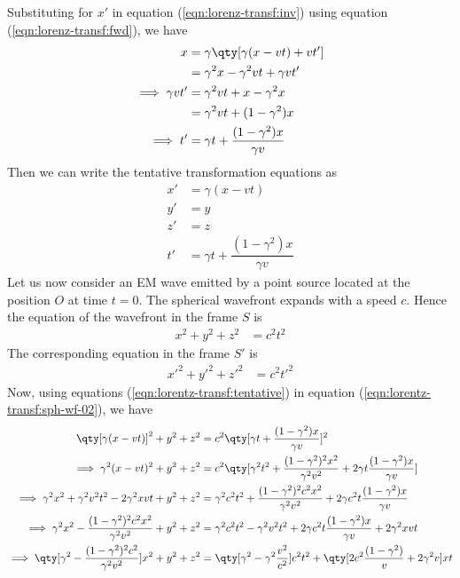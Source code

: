 	Substituting for $x'$ in equation (\ref{eqn:lorenz-transf:inv}) using equation (\ref{eqn:lorenz-transf:fwd}), we have
	\begin{align*}
		x&=\gamma\qty[\gamma(x-vt)+vt'] \\
			&=\gamma^2x-\gamma^2vt+\gamma vt' \\
		\implies \gamma vt'&=\gamma^2vt+x-\gamma^2x \\
			&=\gamma^2vt+(1-\gamma^2)x \\
		\implies t'&=\gamma t+\dfrac{(1-\gamma^2)x}{\gamma v}
	\end{align*}
	Then we can write the tentative transformation equations as
	\begin{equation} \label{eqn:lorentz-transf:tentative}
		\boxed{
			\begin{aligned}
				x'&=\gamma(x-vt) \\
				y'&=y \\
				z'&=z \\
				t'&=\gamma t+\dfrac{(1-\gamma^2)x}{\gamma v}
			\end{aligned}
		}
	\end{equation}
	Let us now consider an EM wave emitted by a point source located at the position $O$ at time $t=0$. The spherical wavefront expands with a speed $c$. Hence the equation of the wavefront in the frame $S$ is
	\begin{align}
		x^2+y^2+z^2&=c^2t^2 \label{eqn:lorentz-transf:sph-wf-01}
	\end{align}
	The corresponding equation in the frame $S'$ is
	\begin{align}
		x'^2+y'^2+z'^2&=c^2t'^2 \label{eqn:lorentz-transf:sph-wf-02}
	\end{align}
	Now, using equations (\ref{eqn:lorentz-transf:tentative}) in equation (\ref{eqn:lorentz-transf:sph-wf-02}), we have
	\begin{align}
		\qty[\gamma(x-vt)]^2+y^2+z^2&=c^2\qty[\gamma t+\dfrac{(1-\gamma^2)x}{\gamma v}]^2 \nonumber\\
		\implies \gamma^2(x-vt)^2+y^2+z^2&=c^2\qty[\gamma^2t^2+\dfrac{(1-\gamma^2)^2x^2}{\gamma^2v^2}+2\gamma t\dfrac{(1-\gamma^2)x}{\gamma v}] \nonumber\\
		\implies \gamma^2x^2+\gamma^2v^2t^2-2\gamma^2xvt+y^2+z^2&=\gamma^2c^2t^2+\dfrac{(1-\gamma^2)^2c^2x^2}{\gamma^2v^2}+2\gamma c^2t\dfrac{(1-\gamma^2)x}{\gamma v} \nonumber\\
		\implies\gamma^2x^2-\dfrac{(1-\gamma^2)^2c^2x^2}{\gamma^2v^2}+y^2+z^2&=\gamma^2c^2t^2-\gamma^2v^2t^2+2\gamma c^2t\dfrac{(1-\gamma^2)x}{\gamma v}+2\gamma^2xvt \nonumber\\
		\implies\qty[\gamma^2-\dfrac{(1-\gamma^2)^2c^2}{\gamma^2v^2}]x^2+y^2+z^2&=\qty[\gamma^2-\gamma^2\dfrac{v^2}{c^2}]c^2t^2+\qty[2c^2\dfrac{(1-\gamma^2)}{v}+2\gamma^2v]xt \label{eqn:lorentz-transf:combn}
	\end{align}
